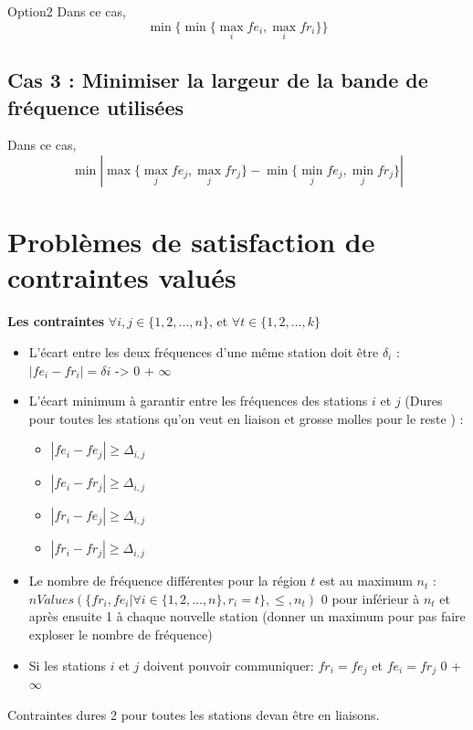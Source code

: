 \documentclass[a4paper, 10pt]{article}
\begin{document}
      Option2
      Dans ce cas,
      $$ \displaystyle{\min \{ \min \{ \max_{i} fe_i , \max_{i} fr_i \} \}} $$

    \subsection{Cas 3 : Minimiser la largeur de la bande de fréquence utilisées}

      Dans ce cas,
      $$ \displaystyle{ \min_{} | \max_{} \{\max_{j} fe_j, \max_{j} fr_j\}  - \min_{} \{\min_{j} fe_j, \min_{j} fr_j\}  |} $$

  \section{Problèmes de satisfaction de contraintes valués}

  \textbf{Les contraintes} $\forall i,j \in \{1,2,...,n \}$, et $\forall t \in \{1,2,...,k\}$
  \begin{itemize}
    \item L'écart entre les deux fréquences d'une même station doit être $\delta_{i}$ :
     $| fe_{i} - fr_{i} | = \delta{i}$ -> \color{green} 0 \color{red} + $\infty$ \color{black}
    \item L'écart minimum à garantir entre les fréquences des stations $i$ et $j$ (Dures pour toutes les stations qu'on veut en liaison et grosse molles pour le reste ) :
    \begin{itemize}
      \item $| fe_i - fe_j | \geq \Delta_{i,j}$
      \item $| fe_i - fr_j | \geq \Delta_{i,j}$
      \item $| fr_i - fe_j | \geq \Delta_{i,j}$
      \item $| fr_i - fr_j | \geq \Delta_{i,j}$
    \end{itemize}
    \item Le nombre de fréquence différentes pour la région $t$ est au maximum $n_t$ : $nValues(\{fr_{i}, fe_{i} | \forall i \in \{1,2,...,n \}, r_{i} = t \}, \leq, n_{t})$ 0 pour inférieur à $n_t$ et après ensuite 1 à chaque nouvelle station (donner un maximum pour pas faire exploser le nombre de fréquence)
    \item Si les stations $i$ et $j$ doivent pouvoir communiquer:
    $fr_i = fe_j$ et $fe_i = fr_j$  \color{green} 0 \color{red} + $\infty$ \color{black}
  \end{itemize}

  Contraintes dures 2 pour toutes les stations devan être en liaisons.
\end{document}
